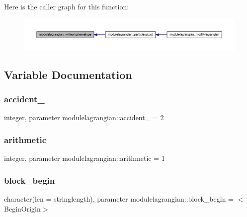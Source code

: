 Here is the caller graph for this function\+:\nopagebreak
\begin{figure}[H]
\begin{center}
\leavevmode
\includegraphics[width=350pt]{namespacemodulelagrangian_ad8e85e4295614bd67b14e48cf963619a_icgraph}
\end{center}
\end{figure}


\subsection{Variable Documentation}
\mbox{\label{namespacemodulelagrangian_a46e68ebc0ee20eacf75641e0c1545a88}} 
\subsubsection{\texorpdfstring{accident\+\_\+}{accident\_}}
{\footnotesize\ttfamily integer, parameter modulelagrangian\+::accident\+\_\+ = 2\hspace{0.3cm}{\ttfamily [private]}}

\mbox{\label{namespacemodulelagrangian_ad75e0a9327fd989cf7acd4437fa3137c}} 
\subsubsection{\texorpdfstring{arithmetic}{arithmetic}}
{\footnotesize\ttfamily integer, parameter modulelagrangian\+::arithmetic = 1\hspace{0.3cm}{\ttfamily [private]}}

\mbox{\label{namespacemodulelagrangian_a3b2b97e0ca43dc95463c7c495dba5bbc}} 
\subsubsection{\texorpdfstring{block\+\_\+begin}{block\_begin}}
{\footnotesize\ttfamily character(len = stringlength), parameter modulelagrangian\+::block\+\_\+begin = \textquotesingle{}$<$Begin\+Origin$>$\textquotesingle{}\hspace{0.3cm}{\ttfamily [private]}}

